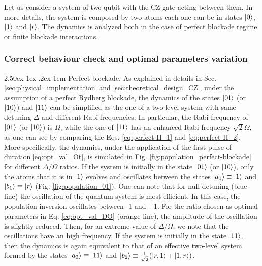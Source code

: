 \documentclass[rmp,10pt,onecolumn,fleqn,notitlepage]{revtex4-1}
\makeatletter
\renewcommand{\paragraph}{%
    \@startsection{paragraph}{4}%
    {\z@}{2.50ex \@plus 1ex \@minus .2ex}{-1em}%
    {\bf\sffamily}%
}
\makeatother
\begin{document}
Let us consider a system of two-qubit with the CZ gate acting between them. In more details, the system is composed by two atoms each one can be in states $\left\vert{0}\right\rangle$, $\left\vert{1}\right\rangle$ and $\left\vert{r}\right\rangle$. The dynamics is analyzed both in the case of perfect blockade regime or finite blockade interactions. 

\subsubsection{Correct behaviour check and optimal parameters variation}

\paragraph{Perfect blockade.} As explained in details in Sec. \ref{sec:physical_implementation} and \ref{sec:theoretical_design_CZ}, under the assumption of a perfect Rydberg blockade, the dynamics of the states $\left\vert{01}\right\rangle$ (or $\left\vert{10}\right\rangle$) and $\left\vert{11}\right\rangle$ can be simplified as the one of a two-level system with same detuning $\Delta$ and different Rabi frequencies. In particular, the Rabi frequency of $\left\vert{01}\right\rangle$ (or $\left\vert{10}\right\rangle$) is $\Omega$, while the one of $\left\vert{11}\right\rangle$ has an enhanced Rabi frequency $\sqrt{2}\Omega$, as one can see by comparing the Eqs. \eqref{eq:perfect-H_1} and \eqref{eq:perfect-H_2}. More specifically, the dynamics, under the application of the first pulse of duration \eqref{eq:opt_val_Ot}, is simulated in Fig. \ref{fig:population_perfect-blockade} for different $\Delta/\Omega$ ratios. If the system is initially in the state $\left\vert{01}\right\rangle$ (or $\left\vert{10}\right\rangle$), only the atoms that it is in $\left\vert{1}\right\rangle$ evolves and oscillates between the states $\left\vert{a_1}\right\rangle\equiv\left\vert{1}\right\rangle$ and $\left\vert{b_1}\right\rangle\equiv\left\vert{r}\right\rangle$ (Fig. \ref{fig:population_01}). 
One can note that for null detuning (blue line) the oscillation of the quantum system is most efficient. In this case, the population inversion oscillates between -1 and +1. For the ratio chosen as optimal parameters in Eq. \eqref{eq:opt_val_DO} (orange line), the amplitude of the oscillation is slightly reduced. Then, for an extreme value of $\Delta/\Omega$, we note that the oscillations have an high frequency. If the system is initially in the state $\left\vert{11}\right\rangle$, then the dynamics is again equivalent to that of an effective two-level system formed by the states $\left\vert{a_2}\right\rangle\equiv\left\vert{11}\right\rangle$ and $\left\vert{b_2}\right\rangle\equiv \frac{1}{\sqrt{2}} \qty( \left\vert{r,1}\right\rangle + \left\vert{1,r}\right\rangle )$.
\end{document}
